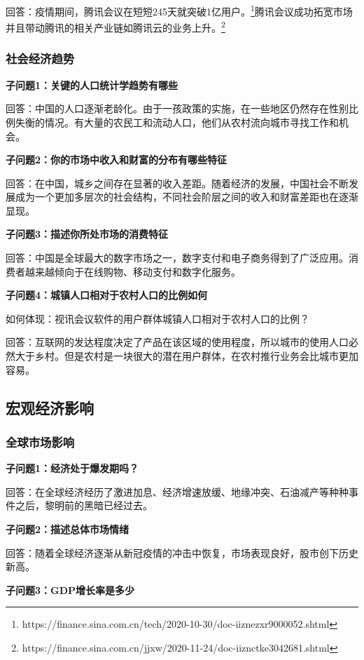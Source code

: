 \documentclass[a4paper,12pt]{article}
\begin{document}
    回答：疫情期间，腾讯会议在短短245天就突破1亿用户。\footnote{https://finance.sina.com.cn/tech/2020-10-30/doc-iiznezxr9000052.shtml}腾讯会议成功拓宽市场并且带动腾讯的相关产业链如腾讯云的业务上升。\footnote{https://finance.sina.com.cn/jjxw/2020-11-24/doc-iiznctke3042681.shtml}

    
    \subsubsection{社会经济趋势}
    \textbf{子问题1：关键的人口统计学趋势有哪些}

    回答：中国的人口逐渐老龄化。由于一孩政策的实施，在一些地区仍然存在性别比例失衡的情况。有大量的农民工和流动人口，他们从农村流向城市寻找工作和机会。

    \textbf{子问题2：你的市场中收入和财富的分布有哪些特征}

    回答：在中国，城乡之间存在显著的收入差距。随着经济的发展，中国社会不断发展成为一个更加多层次的社会结构，不同社会阶层之间的收入和财富差距也在逐渐显现。

    \textbf{子问题3：描述你所处市场的消费特征}

    回答：中国是全球最大的数字市场之一，数字支付和电子商务得到了广泛应用。消费者越来越倾向于在线购物、移动支付和数字化服务。

    \textbf{子问题4：城镇人口相对于农村人口的比例如何}

    如何体现：视讯会议软件的用户群体城镇人口相对于农村人口的比例？

    回答：互联网的发达程度决定了产品在该区域的使用程度，所以城市的使用人口必然大于乡村。但是农村是一块很大的潜在用户群体，在农村推行业务会比城市更加容易。

    \subsection{宏观经济影响}
    \subsubsection{全球市场影响}
    \textbf{子问题1：经济处于爆发期吗？}

    回答：在全球经济经历了激进加息、经济增速放缓、地缘冲突、石油减产等种种事件之后，黎明前的黑暗已经过去。
    
    \textbf{子问题2：描述总体市场情绪}

    回答：随着全球经济逐渐从新冠疫情的冲击中恢复，市场表现良好，股市创下历史新高。

    \textbf{子问题3：GDP增长率是多少}
\end{document}
